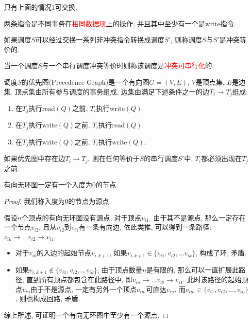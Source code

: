 只有上面的情况1可交换.

\begin{definition}[冲突指令]
  两条指令是不同事务在\textcolor{red}{相同数据项}上的操作, 并且其中至少有一个是write指令.
\end{definition}

\begin{definition}[冲突等价]
  如果调度$S$可以经过交换一系列非冲突指令转换成调度$S'$, 则称调度$S$与$S'$是冲突等价的.
\end{definition}

\begin{definition}[冲突可串行化]
  当一个调度$S$与一个串行调度冲突等价时则称该调度是\textcolor{red}{冲突可串行化}的.
\end{definition}

\begin{definition}[优先图]
  调度$S$的优先图(Precedence Graph)是一个有向图$G=(V,E)$, $V$是顶点集,
  $E$是边集. 顶点集由所有参与调度的事务组成, 边集由满足下述条件之一的边$T_i\to T_j$组成:
  \begin{enumerate}
      \item 在$T_j$执行$\text{read}(Q)$之前, $T_i$执行$\text{write}(Q)$.
      \item 在$T_j$执行$\text{write}(Q)$之前, $T_i$执行$\text{read}(Q)$.
      \item 在$T_j$执行$\text{write}(Q)$之前, $T_i$执行$\text{write}(Q)$.
  \end{enumerate}
\end{definition}

\begin{theorem}
  如果优先图中存在边$T_i\to T_j$, 则在任何等价于$S$的串行调度$S'$中, $T_i$都必须出现在$T_j$之前.
\end{theorem}

\begin{lemma}\label{lemma:DAG}
  有向无环图一定有一个入度为0的节点.
\end{lemma}
\begin{proof}
  我们称入度为0的节点为源点.

  假设$n$个顶点的有向无环图没有源点, 对于顶点$v_{i1}$, 
  由于其不是源点, 那么一定存在一个节点$v_{i2}$, 
  且从$v_{i2}$到$v_{i1}$有一条有向边.
  依此类推, 可以得到一条路径: $v_{ik}\to \dots v_{i2}\to v_{i1}$.
  \begin{itemize}
    \item 对于$v_{ik}$的入边的起始节点$v_{i,k+1}$, 如果$v_{i,k+1}\in\{v_{i1}, v_{i2},\dots v_{ik}\}$, 构成了环, 矛盾.
    \item 如果$v_{i,k+1}\not\in\{v_{i1}, v_{i2},\dots v_{ik}\}$, 由于顶点数量$n$是有限的, 那么可以一直扩展此路径, 直到所有顶点都包含在此路径中, 即$v_{in}\to \dots v_{i2}\to v_{i1}$.
    此时该路径的起始顶点$v_{in}$由于不是源点, 一定有另外一个顶点$v_{im}$可直达$v_{in}$,
    而$v_{im}\in\{v_{i1},v_{i2},\dots,v_{in}\}$, 则也构成回路, 矛盾.
  \end{itemize}
  综上所述, 可证明一个有向无环图中至少有一个源点.
\end{proof}

